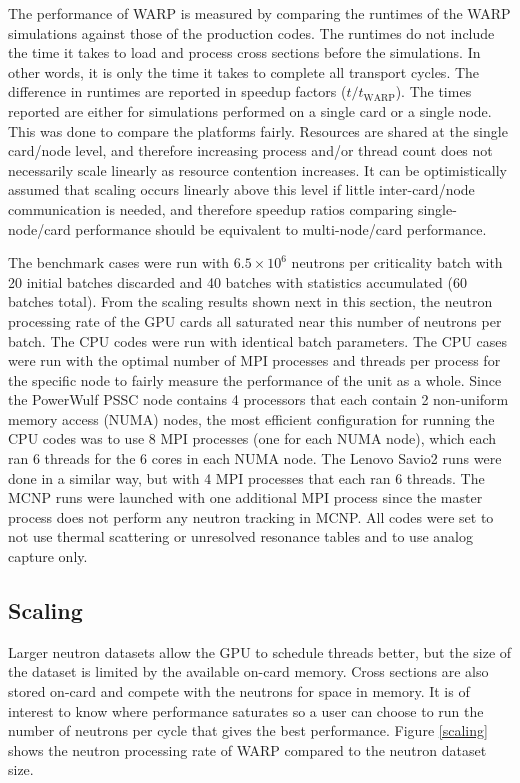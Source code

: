 \documentclass[preprint,12pt]{elsarticle}
\begin{document}
The performance of WARP is measured by comparing the runtimes of the WARP simulations against those of the production codes.  The runtimes do not include the time it takes to load and process cross sections before the simulations.  In other words, it is only the time it takes to complete all transport cycles.  The difference in runtimes are reported in speedup factors ($t/t_\mathrm{WARP}$).  The times reported are either for simulations performed on a single card or a single node.  This was done to compare the platforms fairly.  Resources are shared at the single card/node level, and therefore increasing process and/or thread count does not necessarily scale linearly as resource contention increases.  It can be optimistically assumed that scaling occurs linearly above this level if little inter-card/node communication is needed, and therefore speedup ratios comparing single-node/card performance should be equivalent to multi-node/card performance.

The benchmark cases were run with $6.5\times10^6$ neutrons per criticality batch with 20 initial batches discarded and 40 batches with statistics accumulated (60 batches total).  From the scaling results shown next in this section, the neutron processing rate of the GPU cards all saturated near this number of neutrons per batch.  The CPU codes were run with identical batch parameters.  The CPU cases were run with the optimal number of MPI processes and threads per process for the specific node to fairly measure the performance of the unit as a whole.  Since the PowerWulf PSSC node contains 4 processors that each contain 2 non-uniform memory access (NUMA) nodes, the most efficient configuration for running the CPU codes was to use 8 MPI processes (one for each NUMA node), which each ran 6 threads for the 6 cores in each NUMA node.  The Lenovo Savio2 runs were done in a similar way, but with 4 MPI processes that each ran 6 threads.  The MCNP runs were launched with one additional MPI process since the master process does not perform any neutron tracking in MCNP.  All codes were set to not use thermal scattering or unresolved resonance tables and to use analog capture only.

\subsection{Scaling}

Larger neutron datasets allow the GPU to schedule threads better, but the size of the dataset is limited by the available on-card memory.  Cross sections are also stored on-card and compete with the neutrons for space in memory.  It is of interest to know where performance saturates so a user can choose to run the number of neutrons per cycle that gives the best performance.  Figure \ref{scaling} shows the neutron processing rate of WARP compared to the neutron dataset size.
\end{document}
